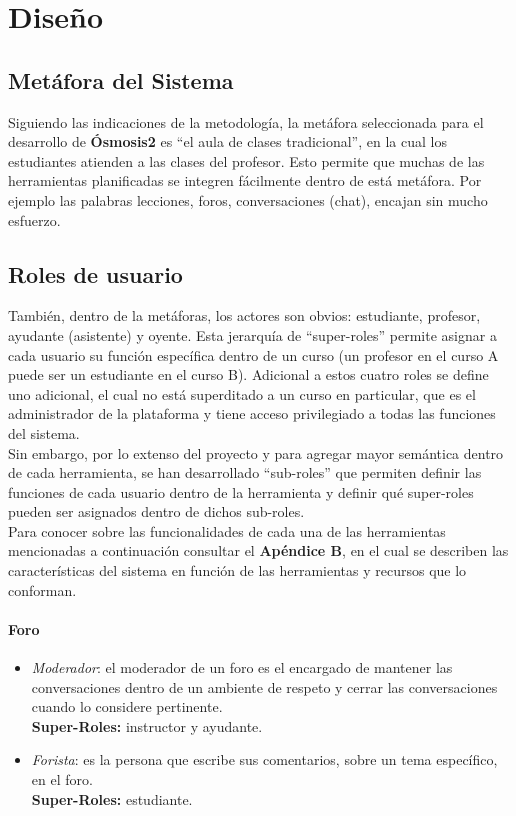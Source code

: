 \chapter{Diseño}
\section{Metáfora del Sistema}
Siguiendo las indicaciones de la metodología, la metáfora seleccionada para el desarrollo de \textbf{Ósmosis2} es ``el aula de clases tradicional'', en la cual los estudiantes atienden a las clases del profesor. Esto permite que muchas de las herramientas planificadas se integren fácilmente dentro de está metáfora. Por ejemplo las palabras lecciones, foros, conversaciones (chat), encajan sin mucho esfuerzo.

\section{Roles de usuario}
También, dentro de la metáforas, los actores son obvios: estudiante, profesor, ayudante (asistente) y oyente. Esta jerarquía de ``super-roles'' permite asignar a cada usuario su función específica dentro de un curso (un profesor en el curso A puede ser un estudiante en el curso B). Adicional a estos cuatro roles se define uno adicional, el cual no está superditado a un curso en particular, que es el administrador de la plataforma y tiene acceso privilegiado a todas las funciones del sistema.\\

Sin embargo, por lo extenso del proyecto y para agregar mayor semántica dentro de cada herramienta, se han desarrollado ``sub-roles'' que permiten definir las funciones de cada usuario dentro de la herramienta y definir qué super-roles pueden ser asignados dentro de dichos sub-roles.\\

Para conocer sobre las funcionalidades de cada una de las herramientas mencionadas a continuación consultar el \textbf{Apéndice B}, en el cual se describen las características del sistema en función de las herramientas y recursos que lo conforman.

\subsubsection{Foro}
\begin{itemize}
	\item \emph{Moderador}: el moderador de un foro es el encargado de mantener las conversaciones dentro de un ambiente de respeto y cerrar las conversaciones cuando lo considere pertinente.\\
		\textbf{Super-Roles:} instructor y ayudante.
	\item \emph{Forista}: es la persona que escribe sus comentarios, sobre un tema específico, en el foro.\\
		\textbf{Super-Roles:} estudiante. 
\end{itemize}

